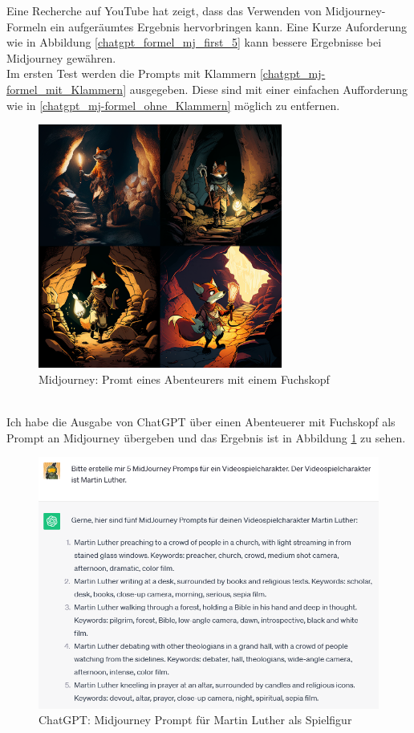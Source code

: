Eine Recherche auf YouTube hat zeigt, dass das Verwenden von Midjourney-Formeln ein aufgeräumtes Ergebnis hervorbringen kann. Eine Kurze Auforderung wie in Abbildung \ref{chatgpt_formel_mj_first_5} kann bessere Ergebnisse bei Midjourney gewähren.
\\
Im ersten Test werden die Prompts mit Klammern \ref{chatgpt_mj-formel_mit_Klammern} ausgegeben. Diese sind mit einer einfachen Aufforderung wie in \ref{chatgpt_mj-formel_ohne_Klammern} möglich zu entfernen.
\\
\begin{figure}[h]
	\centering
	\includegraphics[width=8.022cm]{BilderFuerBA/fuchsKopfAbenteuerer.png}
	\caption{Midjourney: Promt eines Abenteurers mit einem Fuchskopf}
	\label{MidjourneyFuchsKopfAbenteuerer}
\end{figure}
\\
Ich habe die Ausgabe von ChatGPT über einen Abenteuerer mit Fuchskopf als Prompt an Midjourney übergeben und das Ergebnis ist in Abbildung \ref{MidjourneyFuchsKopfAbenteuerer} zu sehen.
\begin{figure}[h]
	\centering
	\includegraphics[scale=0.7]{BilderFuerBA/07.png}
	\caption{ChatGPT: Midjourney Prompt für Martin Luther als Spielfigur}
	\label{chatgptMartinLutherMJformelErstenFünf}
\end{figure}
